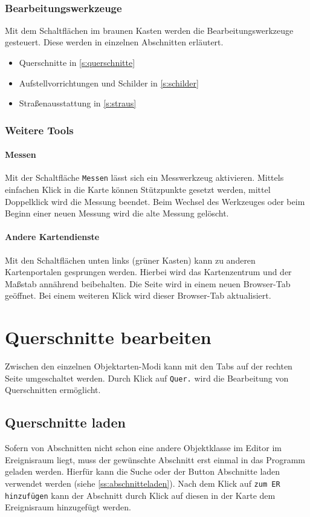 \documentclass[a4paper,11pt,bibliography=totoc, listof=totoc,titlepage]{scrartcl}
\begin{document}
\

\subsubsection{Bearbeitungswerkzeuge}
Mit dem Schaltflächen im braunen Kasten werden die Bearbeitungswerkzeuge gesteuert. Diese werden in einzelnen Abschnitten erläutert.

\begin{itemize}
    \item \Gls{Querschnitt}e in \autoref{s:querschnitte}
    \item Aufstellvorrichtungen und Schilder in \autoref{s:schilder}
    \item Straßenausstattung in \autoref{s:straus}
\end{itemize}

\subsubsection{Weitere Tools}
\paragraph{Messen}
Mit der Schaltfläche \verb|Messen| lässt sich ein Messwerkzeug aktivieren. Mittels einfachen Klick in die Karte können Stützpunkte gesetzt werden, mittel Doppelklick wird die Messung beendet. Beim Wechsel des Werkzeuges oder beim Beginn einer neuen Messung wird die alte Messung gelöscht.

\paragraph{Andere Kartendienste}
Mit den Schaltflächen unten links (grüner Kasten) kann zu anderen Kartenportalen gesprungen werden. Hierbei wird das Kartenzentrum und der Maßstab annährend beibehalten. Die Seite wird in einem neuen Browser-Tab geöffnet. Bei einem weiteren Klick wird dieser Browser-Tab aktualisiert.

\section{Querschnitte bearbeiten}
\label{s:querschnitte}

Zwischen den einzelnen Objektarten-Modi kann mit den Tabs auf der rechten Seite umgeschaltet werden. Durch Klick auf \verb|Quer.| wird die Bearbeitung von \Gls{Querschnitt}en ermöglicht.

\subsection{Querschnitte laden}
Sofern von Abschnitten nicht schon eine andere Objektklasse im Editor im Ereignisraum liegt, muss der gewünschte Abschnitt erst einmal in das Programm geladen werden. Hierfür kann die Suche oder der Button Abschnitte laden verwendet werden (siehe \autoref{ss:abschnitteladen}). Nach dem Klick auf \verb|zum ER hinzufügen| kann der Abschnitt durch Klick auf diesen in der Karte dem Ereignisraum hinzugefügt werden.
\end{document}

